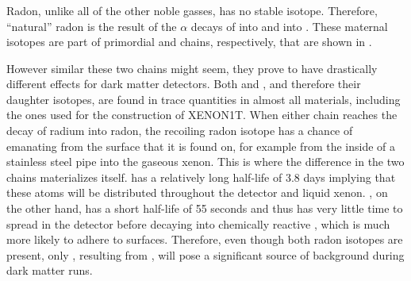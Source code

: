 \subsubsection{}
\label{sec:xe1t_er_rn222}

Radon, unlike all of the other noble gasses, has no stable isotope.  Therefore, ``natural'' radon is the result of the $\alpha$ decays of  into \radon{} and  into .  These maternal isotopes are part of primordial  and  chains, respectively, that are shown in .  

However similar these two chains might seem, they prove to have drastically different effects for dark matter detectors.  Both \uranium{} and \thorium{}, and therefore their daughter isotopes, are found in trace quantities in almost all materials, including the ones used for the construction of XENON1T.  When either chain reaches the decay of radium into radon, the recoiling radon isotope has a chance of emanating from the surface that it is found on, for example from the inside of a stainless steel pipe into the gaseous xenon.  This is where the difference in the two chains materializes itself.  \radon{} has a relatively long half-life of 3.8 days implying that these atoms will be distributed throughout the detector and liquid xenon.  , on the other hand, has a short half-life of 55 seconds and thus has very little time to spread in the detector before decaying into chemically reactive , which is much more likely to adhere to surfaces.  Therefore, even though both radon isotopes are present, only , resulting from \radon{}, will pose a significant source of background during dark matter runs.%

